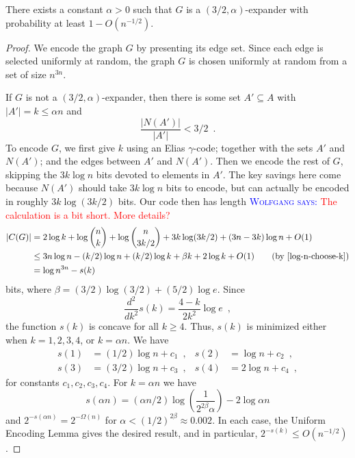\documentclass{patmorin}
\newcommand{\aremark}[3]{\textcolor{blue}{\textsc{#1 #2:}}
  \textcolor{red}{\textsf{#3}}}
\newcommand{\wolfgang}[2][says]{\aremark{Wolfgang}{#1}{#2}}
\begin{document}
\begin{thm}
  There exists a constant $\alpha >0$ such that $G$ is a
  $(3/2,\alpha)$-expander with probability at least $1 - O(n^{-1/2})$.
\end{thm}

\begin{proof}
  We encode the graph $G$ by presenting its edge set. Since each edge
  is selected uniformly at random, the graph $G$ is chosen uniformly at
  random from a set of size $n^{3n}$.
  
  If $G$ is not a $(3/2, \alpha)$-expander, then there is some set $A'
  \subseteq A$ with $|A'|=k\le \alpha n$ and
  \[
  \frac{|N(A')|}{|A'|} < 3/2 \enspace .
  \]
  To encode $G$, we first give $k$ using an Elias $\gamma$-code; together 
  with the sets $A'$ and $N(A')$; and the edges between $A'$ and
  $N(A')$. Then we encode the rest of $G$, skipping the $3k\log n$
  bits devoted to elements in $A'$.  The key savings here come because
  $N(A')$ should take $3k\log n$ bits to encode, but can actually be
  encoded in roughly $3k\log(3k/2)$ bits. Our code then has length
  \wolfgang{The calculation is a bit short. More details?}
  \begin{align*}
    |C(G)| &= 2\log k + \log {n \choose k} + \log {n \choose 3k/2} + 3k \log (3k/2) + (3n - 3k)\log n + O(1) \\
           &\leq 3n \log n - (k/2)\log n + (k/2)\log k + \beta k + 2 \log k + O(1) \tag{by \eqref{log-n-choose-k}}\\
           &= \log n^{3n} - s(k)
  \end{align*}
  bits, where $\beta = (3/2) \log (3/2) + (5/2) \log e$. Since
  \[
    \frac{d^2}{dk^2} s(k) = \frac{4 - k}{2 k^2} \log e \enspace ,
  \]
  the function $s(k)$ is concave for all $k \geq 4$. Thus, $s(k)$ is
  minimized either when $k = 1, 2, 3, 4$, or $k = \alpha n$. We have
  \begin{align*}
    s(1) &= (1/2)\log n + c_1 \enspace , & 
    s(2) &= \log n + c_2 \enspace , \\
    s(3) &= (3/2) \log n + c_3 \enspace , &
    s(4) &= 2 \log n + c_4 \enspace ,
  \end{align*}
  for constants $c_1, c_2, c_3, c_4$. For $k=\alpha n$ we have
  \[
    s(\alpha n) = (\alpha n/2)\log \left(\frac{1}{2^{2\beta}
        \alpha}\right) - 2 \log \alpha n
  \]
  and $2^{-s(\alpha n)} = 2^{-\Omega(n)}$ for
  $\alpha < (1/2)^{2\beta} \approx 0.002$. In each case, the Uniform
  Encoding Lemma gives the desired result, and in particular,
  $2^{-s(k)} \leq O(n^{-1/2})$.
\end{proof}
\end{document}
